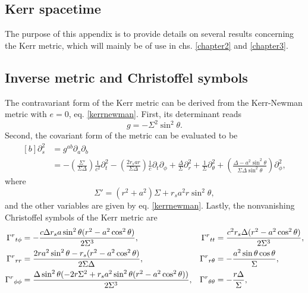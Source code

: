 \documentclass[
12pt,		%
openright,	%
twoside,  %
a4paper,			%
chapter=TITLE,		%
english,			%
french,				%
spanish,			%
brazil				%
]{USPSC-classe/USPSC}
\begin{document}
\begin{apendicesenv}
\chapter{Kerr spacetime}\label{apb}

The purpose of this appendix is to provide details on several results concerning the Kerr metric, which will mainly be of use in chs. \ref{chapter2} and \ref{chapter3}.

\section{Inverse metric and Christoffel symbols}\label{B1}
The contravariant form of the Kerr metric can be derived from the Kerr-Newman metric with $e=0$, eq. \ref{kerrnewman}. First, its determinant reads
\begin{equation}
    g=-\Sigma^2\sin^2{\theta}.
\end{equation}
Second, the covariant form of the metric can be evaluated to be
\begin{equation}
    \begin{aligned}[b]
    \partial^2_s &=g^{ab}\partial_a\partial_b\\
         &=-\left(\frac{\Sigma'}{\Sigma\Delta}\right)\frac{1}{c^2}\partial^2_t-\left(\frac{2r_s a r }{\Sigma\Delta}\right)\frac{1}{c}\partial_t\partial_\phi+\frac{\Delta}{\Sigma}\partial^2_r+\frac{1}{\Sigma}\partial^2_\theta+\left(\frac{\Delta-a^2\sin^2{\theta}}{\Sigma\Delta\sin^2{\theta}}\right)\partial^2_\phi,
    \end{aligned}
\end{equation}
where
\begin{equation}
    \Sigma'=(r^2+a^2)\Sigma+r_sa^2r\sin^2{\theta},
\end{equation}
and the other variables are given by eq. \ref{kerrnewman}. Lastly, the nonvanishing Christoffel symbols of the Kerr metric are \cite{Muller2010}
\begin{align*}
\Gamma^{r}\mathstrut_{t\phi}&=-\frac{c\Delta r_sa\sin^2{\theta}(r^2-a^2\cos^2{\theta})}{2\Sigma^3}, & \Gamma^{r}\mathstrut_{tt}&=\frac{c^2r_s\Delta(r^2-a^2\cos^2{\theta})}{2\Sigma^3},\\
\Gamma^{r}\mathstrut_{rr}&=\frac{2ra^2\sin^2{\theta}-r_s(r^2-a^2\cos^2{\theta})}{2\Sigma\Delta},  &  \Gamma^{r}\mathstrut_{r\theta}&=-\frac{a^2\sin{\theta}\cos{\theta}}{\Sigma},\\
\Gamma^{r}\mathstrut_{\phi\phi}&=\frac{\Delta\sin^2{\theta}(-2r\Sigma^2+r_s a^2\sin^2{\theta}(r^2-a^2\cos^2{\theta}))}{2\Sigma^3}, &  \Gamma^{r}\mathstrut_{\theta\theta}&=-\frac{r\Delta}{\Sigma},\\

\end{align*}
\end{apendicesenv}
\end{document}
